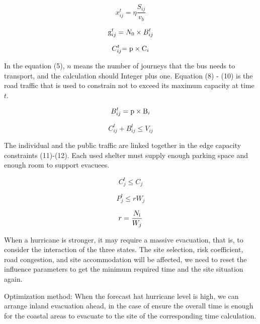 \documentclass{mcmthesis}
\begin{document}
\begin{equation}\label{8}
x_{ij}^t = \eta \frac{{{S_{ij}}}}{{{v_b}}}
\end{equation}

\begin{equation}\label{9}
{\rm{g}}_{ij}^t = {N_0} \times B_{ij}^t
\end{equation}

\begin{equation}\label{10}
C_{ij}^t{\rm{ = p}} \times {{\rm{C}}_i}
\end{equation}

In the equation (5), $n$ means the number of journeys that the bus needs to transport, and the calculation should Integer plus one. Equation (8) - (10) is the road traffic that is used to constrain not to exceed its maximum capacity at time $t$.

\begin{equation}\label{11}
B_{ij}^t = {\rm{p}} \times {{\rm{B}}_i}
\end{equation}

\begin{equation}\label{12}
C_{ij}^t + B_{ij}^t \le {V_{ij}}
\end{equation}

The individual and the public traffic are linked together in the edge capacity constraints (11)-(12). Each used shelter must supply enough parking space and enough room to support evacuees.

\begin{equation}\label{13}
C_j^t \le {C_j}
\end{equation}

\begin{equation}\label{14}
P_j^t \le r{W_j}
\end{equation}

\begin{equation}\label{15}
r = \frac{{{N_{\rm{i}}}}}{{{W_j}}}
\end{equation}

When a hurricane is stronger, it may require a massive evacuation, that is, to consider the interaction of the three states. The site selection, risk coefficient, road congestion, and site accommodation will be affected, we need to reset the influence parameters to get the minimum required time and the site situation again.

Optimization method: When the forecast hat hurricane level is high, we can arrange inland evacuation ahead, in the case of ensure the overall time is enough for the coastal areas to evacuate to the site of the corresponding time calculation.
\end{document}

